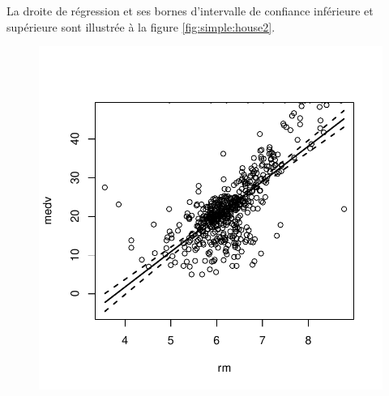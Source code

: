 \begin{solution}{2.17}
\begin{enumerate}
      La droite de régression et ses bornes d'intervalle de confiance
      inférieure et supérieure sont illustrée à la figure
      \ref{fig:simple:house2}.
      \begin{figure}
\begin{knitrout}
\color{fgcolor}\begin{kframe}
\begin{alltt}
 \hlkwb{<-} \hlopt{$}
 \hlopt{~}     \hlstd{=} 
\hlopt{$}
         \hlstd{=} \hlstd{,}  \hlstd{=} \hlstd{(}\hlstd{,} \hlstd{,} \hlstd{),} \hlstd{=} \hlstd{,}
         \hlstd{=} \hlstd{,}  \hlstd{=} \hlstd{)}
\end{alltt}
\end{kframe}

{\centering \includegraphics[width=.45\linewidth]{figure/fig-simple-house2-1}

}




\end{knitrout}
\end{figure}
\end{enumerate}
\end{solution}
